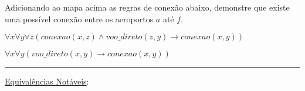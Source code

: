 \documentclass[11pt, a4paper,final]{article}
\begin{document}
\begin{enumerate}
Adicionando ao mapa acima  as regras de conexão abaixo, demonstre  que existe uma possível
conexão  entre os aeroportos  $a$ até $f$.
\begin{description}
\setlength{\itemsep}{-2pt}
  \item[11.]  $\forall x \forall y \forall z ( conexao(x,z) \wedge voo\_direto(z,y) \rightarrow  conexao(x,y) )$
\item[12.] $\forall x \forall y (voo\_direto(x,y)  \rightarrow  conexao(x,y) )$
\end{description}
  



\end{enumerate}



\noindent\rule{\textwidth}{4pt}



\underline{{\large Equivalências Notáveis}}:
\end{document}
